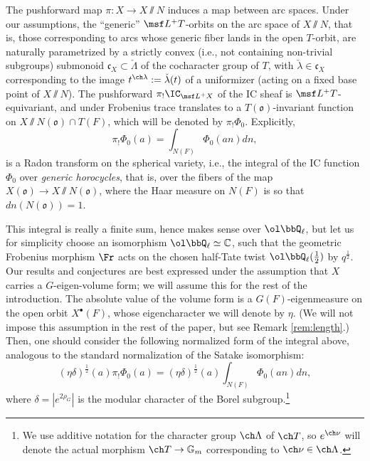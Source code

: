 The pushforward map $\pi: X\to X\sslash N$ induces a map between arc spaces. Under our assumptions, the ``generic'' $\msf L^+T$-orbits on the arc space of $X\sslash N$, that is, those corresponding to arcs whose generic fiber lands in the open $T$-orbit, are naturally parametrized by a strictly convex (i.e., not containing non-trivial subgroups) submonoid $\mathfrak c_X\subset \check\Lambda$ of the cocharacter group of $T$, with $\check\lambda\in\mathfrak c_X$ corresponding to the image $t^{\ch\lambda}:=\check\lambda(t)$ of a uniformizer (acting on a fixed base point of $X\sslash N$). The pushforward $\pi_! \IC_{\msf L^+X}$ of the IC sheaf is $\msf L^+T$-equivariant, and under Frobenius trace translates to a $T(\mathfrak o)$-invariant function on $X\sslash N (\mathfrak o) \cap T(F)$, which will be denoted by $\pi_! \Phi_0$. Explicitly,
\[ \pi_! \Phi_0 (a) = \int_{N(F)} \Phi_0(an) dn,\]
is a Radon transform on the spherical variety, i.e., the integral of the IC function $\Phi_0$ over \emph{generic horocycles}, that is, over the fibers of the map $X(\mathfrak o)\to X\sslash N(\mathfrak o)$, where the Haar measure on $N(F)$ is so that $dn(N(\mathfrak o))=1$.



This integral is really a finite sum, hence makes sense over $\ol\bbQ_\ell$, but let us for simplicity choose an isomorphism $\ol\bbQ_\ell \simeq \mathbb C$, such that the geometric Frobenius morphism $\Fr$ acts on the chosen half-Tate twist $\ol\bbQ_\ell(\frac{1}{2})$ by $q^\frac{1}{2}$.
Our results and conjectures are best expressed under the assumption that $X$ carries a $G$-eigen-volume form;  we will assume this for the rest of the introduction. The absolute value of the volume form is a $G(F)$-eigenmeasure on the open orbit $X^\bullet(F)$, whose  eigencharacter we will denote by $\eta$. (We will not impose this assumption in the rest of the paper, but see Remark \ref{rem:length}.) Then, one should consider the following normalized form of the integral above, analogous to the standard normalization of the Satake isomorphism:
\begin{equation}
(\eta\delta)^\frac{1}{2}(a) \pi_! \Phi_0 (a) = (\eta\delta)^\frac{1}{2}(a)\int_{N(F)} \Phi_0(an) dn,
\end{equation}
where $\delta = |e^{2\rho_G}|$ is the modular character of the Borel subgroup.\footnote{We use additive notation for the character group $\ch\Lambda$ of $\ch T$, so $e^{\ch\nu}$ will denote the actual morphism $\ch T\to \mathbb G_m$ corresponding to $\ch\nu\in \ch\Lambda$.}


